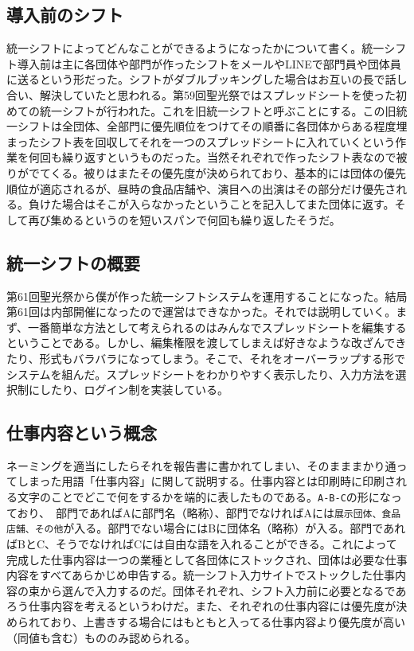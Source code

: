 \documentclass[dvipdfmx,jb5]{jreport}
\begin{document}
\subsection{導入前のシフト}
統一シフトによってどんなことができるようになったかについて書く。統一シフト導入前は主に各団体や部門が作ったシフトをメールやLINEで部門員や団体員に送るという形だった。シフトがダブルブッキングした場合はお互いの長で話し合い、解決していたと思われる。第59回聖光祭ではスプレッドシートを使った初めての統一シフトが行われた。これを旧統一シフトと呼ぶことにする。この旧統一シフトは全団体、全部門に優先順位をつけてその順番に各団体からある程度埋まったシフト表を回収してそれを一つのスプレッドシートに入れていくという作業を何回も繰り返すというものだった。当然それぞれで作ったシフト表なので被りがでてくる。被りはまたその優先度が決められており、基本的には団体の優先順位が適応されるが、昼時の食品店舗や、演目への出演はその部分だけ優先される。負けた場合はそこが入らなかったということを記入してまた団体に返す。そして再び集めるというのを短いスパンで何回も繰り返したそうだ。
\subsection{統一シフトの概要}
第61回聖光祭から僕が作った統一シフトシステムを運用することになった。結局第61回は内部開催になったので運営はできなかった。それでは説明していく。まず、一番簡単な方法として考えられるのはみんなでスプレッドシートを編集するということである。しかし、編集権限を渡してしまえば好きなような改ざんできたり、形式もバラバラになってしまう。そこで、それをオーバーラップする形でシステムを組んだ。スプレッドシートをわかりやすく表示したり、入力方法を選択制にしたり、ログイン制を実装している。
\subsection{仕事内容という概念}
ネーミングを適当にしたらそれを報告書に書かれてしまい、そのまままかり通ってしまった用語「仕事内容」に関して説明する。仕事内容とは印刷時に印刷される文字のことでどこで何をするかを端的に表したものである。\verb+A-B-C+の形になっており、　部門であればAに部門名（略称）、部門でなければAには\verb+展示団体、食品店舗、その他+が入る。部門でない場合にはBに団体名（略称）が入る。部門であればBとC、そうでなければCには自由な語を入れることができる。これによって完成した仕事内容は一つの業種として各団体にストックされ、団体は必要な仕事内容をすべてあらかじめ申告する。統一シフト入力サイトでストックした仕事内容の束から選んで入力するのだ。団体それぞれ、シフト入力前に必要となるであろう仕事内容を考えるというわけだ。また、それぞれの仕事内容には優先度が決められており、上書きする場合にはもともと入ってる仕事内容より優先度が高い（同値も含む）もののみ認められる。
\end{document}
